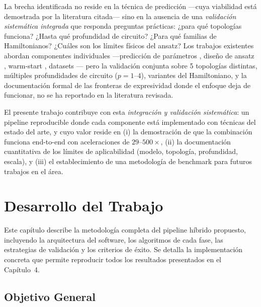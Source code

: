 \documentclass[11pt,a4paper,spanish]{book}
\begin{document}
La brecha identificada no reside en la técnica de predicción ---cuya viabilidad está demostrada por la literatura citada--- sino en la ausencia de una \emph{validación sistemática integrada} que responda preguntas prácticas: ¿para qué topologías funciona? ¿Hasta qué profundidad de circuito? ¿Para qué familias de Hamiltonianos? ¿Cuáles son los límites físicos del ansatz? Los trabajos existentes abordan componentes individuales ---predicción de parámetros \citep{miao2024, zhang2025, huang2025palqo}, diseño de ansatz \citep{wiersema2020, tripathi2026}, warm-start \citep{puig2025}, datasets \citep{zhang2025vqezy}--- pero la validación conjunta sobre 5 topologías distintas, múltiples profundidades de circuito ($p = 1$--$4$), variantes del Hamiltoniano, y la documentación formal de las fronteras de expresividad donde el enfoque deja de funcionar, no se ha reportado en la literatura revisada.

El presente trabajo contribuye con esta \emph{integración y validación sistemática}: un pipeline reproducible donde cada componente está implementado con técnicas del estado del arte, y cuyo valor reside en (i) la demostración de que la combinación funciona end-to-end con aceleraciones de $29$--$500\times$, (ii) la documentación cuantitativa de los límites de aplicabilidad (modelo, topología, profundidad, escala), y (iii) el establecimiento de una metodología de benchmark para futuros trabajos en el área.



\chapter{Desarrollo del Trabajo}

Este capítulo describe la metodología completa del pipeline híbrido propuesto, incluyendo la arquitectura del software, los algoritmos de cada fase, las estrategias de validación y los criterios de éxito. Se detalla la implementación concreta que permite reproducir todos los resultados presentados en el Capítulo~4.

\section{Objetivo General}
\end{document}
